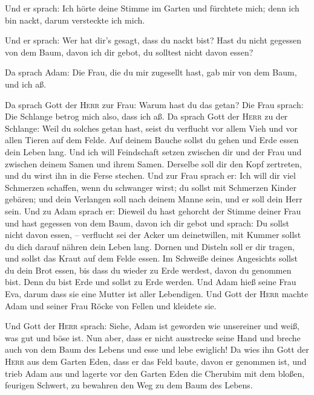  Und er sprach: Ich hörte deine Stimme im Garten und
fürchtete mich; denn ich bin nackt, darum versteckte ich mich.

 Und er sprach: Wer hat dir's gesagt, dass du nackt bist?
Hast du nicht gegessen von dem Baum, davon ich dir gebot, du solltest
nicht davon essen?

 Da sprach Adam: Die Frau, die du mir zugesellt hast, gab
mir von dem Baum, und ich aß.

 Da sprach Gott der \textsc{Herr} zur Frau: Warum hast du
das getan? Die Frau sprach: Die Schlange betrog mich also, dass ich aß.
 Da sprach Gott der \textsc{Herr} zu der Schlange: Weil
du solches getan hast, seist du verflucht vor allem Vieh und vor allen
Tieren auf dem Felde. Auf deinem Bauche sollst du gehen und Erde essen
dein Leben lang.  Und ich will Feindschaft setzen
zwischen dir und der Frau und zwischen deinem Samen und ihrem Samen.
Derselbe soll dir den Kopf zertreten, und du wirst ihn in die Ferse
stechen.  Und zur Frau sprach er: Ich will dir viel
Schmerzen schaffen, wenn du schwanger wirst; du sollst mit Schmerzen
Kinder gebären; und dein Verlangen soll nach deinem Manne sein, und er
soll dein Herr sein.  Und zu Adam sprach er: Dieweil du
hast gehorcht der Stimme deiner Frau und hast gegessen von dem Baum,
davon ich dir gebot und sprach: Du sollst nicht davon essen, --
verflucht sei der Acker um deinetwillen, mit Kummer sollst du dich
darauf nähren dein Leben lang.  Dornen und Disteln soll
er dir tragen, und sollst das Kraut auf dem Felde essen. 
Im Schweiße deines Angesichts sollst du dein Brot essen, bis dass du
wieder zu Erde werdest, davon du genommen bist. Denn du bist Erde und
sollst zu Erde werden.  Und Adam hieß seine Frau Eva,
darum dass sie eine Mutter ist aller Lebendigen.  Und
Gott der \textsc{Herr} machte Adam und seiner Frau Röcke von Fellen und
kleidete sie.

 Und Gott der \textsc{Herr} sprach: Siehe, Adam ist
geworden wie unsereiner und weiß, was gut und böse ist. Nun aber, dass
er nicht ausstrecke seine Hand und breche auch von dem Baum des Lebens
und esse und lebe ewiglich!  Da wies ihn Gott der
\textsc{Herr} aus dem Garten Eden, dass er das Feld baute, davon er
genommen ist,  und trieb Adam aus und lagerte vor den
Garten Eden die Cherubim mit dem bloßen, feurigen Schwert, zu bewahren
den Weg zu dem Baum des Lebens.

